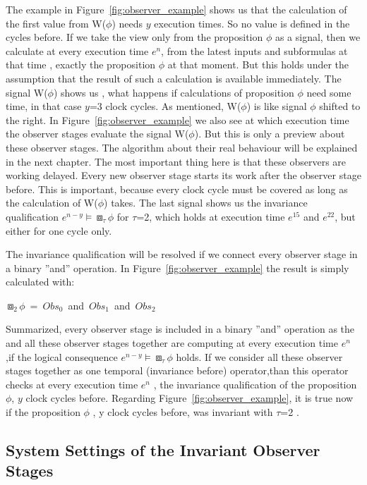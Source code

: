 The example in Figure~\ref{fig:observer_example} shows us that the calculation of the first value from  W($\phi$) needs $y$
execution times. So no value is defined in the cycles before. If we take the view only from the proposition $\phi$ as a signal, then we calculate
at every execution time $e^n$, from the latest inputs and subformulas at that time , exactly the proposition $\phi$ at that moment.
But this holds under the assumption that the result of such a calculation is available immediately.
The signal W($\phi$) shows us , what happens if calculations of proposition $\phi$ need some time, in that case $y$=3 clock cycles.
As mentioned, W($\phi$) is like signal $\phi$ shifted to the right.
In Figure~\ref{fig:observer_example} we also see at which execution time the observer stages evaluate the signal W($\phi$).
But this is only a preview about these observer stages. The algorithm about their real behaviour will be explained in the next chapter.
The most important thing here is that these observers are working delayed. Every new observer stage starts its work after the observer stage before.
This is important, because every clock cycle must be covered as long as the calculation of W($\phi$) takes. 
The last signal shows us the invariance qualification $e^{n-y} \models \boxbox_\tau \phi$ for $\tau$=2, which holds at execution time $e^{15}$ and $e^{22}$,
but either for one cycle only.

The invariance qualification will be resolved if we connect every observer stage in a binary ''and'' operation.
In Figure~\ref{fig:observer_example} the result is simply calculated with:
\newline
\begin{center} 
\mbox{$\boxbox_2 \phi$ =  $Obs_0$ and  $Obs_1$  and  $Obs_2$}
\end{center}
\newpage
Summarized,  every observer stage is included in a binary ''and'' operation as the and all these observer stages together are computing at every execution time $e^n$
,if the logical consequence $e^{n-y} \models \boxbox_\tau \phi$ holds. 
If we consider all these observer stages together as one temporal (invariance before) operator,than this operator checks
at every execution time  $e^n$ , the invariance qualification of the proposition $\phi$, $y$ clock cycles before.
Regarding Figure~\ref{fig:observer_example}, it is true now if the proposition $\phi$ , y clock cycles before, was invariant with $\tau$=2 .
\newline

\subsection{System Settings of the Invariant Observer Stages}


